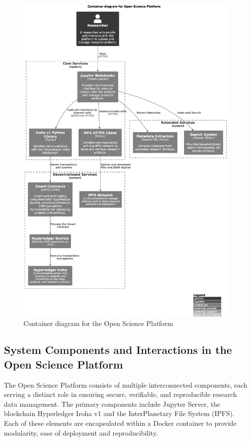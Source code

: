 \documentclass{article}
\begin{document}
\begin{figure}[htbp]
    \centering
    \includegraphics[width=0.98\textwidth, keepaspectratio]{c4_container_diagram}
    \caption{Container diagram for the Open Science Platform}
    \label{fig:c4_container_diagram}
\end{figure}


\subsection{System Components and Interactions in the Open Science Platform}

The Open Science Platform consists of multiple interconnected components, each serving a distinct role in ensuring secure, verifiable, and reproducible research data management. The primary components include Jupyter Server, the blockchain Hyperledger Iroha v1 and the InterPlanetary File System (IPFS). Each of these elements are encapsulated within a Docker container to provide modularity, ease of deployment and reproducibility.
\end{document}
